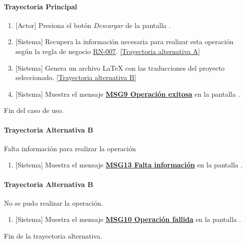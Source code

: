 \paragraph{Trayectoria Principal}
	\begin{enumerate}
	    \item {[Actor]} Presiona el botón \textit{Descargar} de la pantalla  \textbf{}.
	    \item {[Sistema]} Recupera la información necesaria para realizar esta operación según la regla de negocio \hyperref[RN007]{RN-007}. \hyperref[W-PR-CU1.1.2:TA]{[Trayectoria alternativa A]}
	    \item {[Sistema]} Genera un archivo LaTeX con las traducciones del proyecto seleccionado. \hyperref[W-PR-CU1.1.2:TB]{[Trayectoria alternativa B]}
	    \item {[Sistema]} Muestra el mensaje \hyperref[MSG9]{\bf MSG9 Operación exitosa} en la pantalla \textbf{}.
	\end{enumerate}
	Fin del caso de uso.

\paragraph{Trayectoria Alternativa B} \label{W-PR-CU1.1.2:TA}
Falta información para realizar la operación
\begin{enumerate}[label=A\arabic*.]
    \item {[Sistema]} Muestra el mensaje \hyperref[MSG13]{\bf MSG13 Falta información}  en la pantalla \textbf{}.
\end{enumerate}

\paragraph{Trayectoria Alternativa B} \label{W-PR-CU1.1.2:TB}
    No se pudo realizar la operación.
	\begin{enumerate}[label=B\arabic*.]
		\item {[Sistema]} Muestra el mensaje \hyperref[MSG10]{\bf MSG10 Operación fallida}  en la pantalla \textbf{}.
	\end{enumerate}
	Fin de la trayectoria alternativa.
